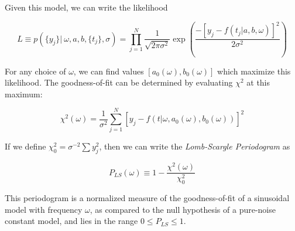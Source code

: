 \documentclass[12pt,pdftex]{article}
\begin{document}
Given this model, we can write the likelihood

\begin{equation}
\label{eq:dataL} 
 L \equiv p(\{y_j\} |~\omega, a, b, \{t_j\}, \sigma) =
  \prod_{j=1}^{N} \frac{1}{\sqrt{2\pi\sigma^2}} \exp\left(
  \frac{-[y_j - f(t_j|a, b, \omega)]^2}{2\sigma^2} \right)
\end{equation}

For any choice of $\omega$, we can find values $[a_0(\omega), b_0(\omega)]$ which maximize this likelihood. The goodness-of-fit can be determined by evaluating $\chi^2$ at this maximum:

\begin{equation}
  \chi^2(\omega) = \frac{1}{\sigma^2}\sum_{j=1}^N[y_j - f(t|\omega, a_0(\omega), b_0(\omega))]^2
\end{equation}

If we define $\chi_0^2 = \sigma^{-2}\sum y_j^2$, then we can write the {\it Lomb-Scargle Periodogram} as

\begin{equation}
\label{eq:PLS} 
  P_{LS}(\omega) \equiv 1 - \frac{\chi^2(\omega)}{\chi_0^2}
\end{equation}

This periodogram is a normalized measure of the goodness-of-fit of a sinusoidal model with frequency $\omega$, as compared to the null hypothesis of a pure-noise constant model, and lies in the range $0 \le P_{LS} \le 1$.
\end{document}

